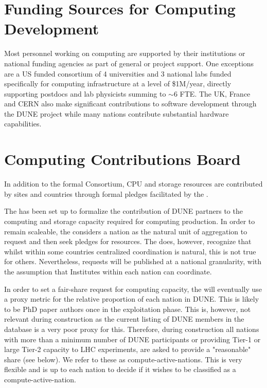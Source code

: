 \documentclass[../main-v1.tex]{subfiles}
\begin{document}
\section{Funding Sources for Computing Development}
Most personnel working on  computing are supported by their institutions or national funding agencies as part of general or  project support.  One exceptions are a US  funded consortium of 4 universities and 3 national labs funded specifically for  computing infrastructure at a level of \$1M/year, directly supporting postdocs and lab physicists summing to $\sim 6$ FTE.  The UK,  France and CERN also make significant contributions to software development through the DUNE project while many nations contribute substantial hardware capabilities. 



\section{Computing Contributions Board }\label{sec:ccb}

In addition to the formal Consortium, CPU and storage resources are contributed by sites and countries through formal pledges facilitated by the . 

The  has been set up to formalize the contribution of DUNE partners to the computing and storage capacity required for computing production. In order to remain scaleable, the  considers a nation as the natural unit of aggregation to request and then seek pledges for resources. The  does, however, recognize that whilst within some countries centralized coordination is natural, this is not true for others. Nevertheless, requests will be published at a national granularity, with the assumption that Institutes within each nation can coordinate.

In order to set a fair-share request for computing capacity, the  will eventually use a proxy metric for the relative proportion of each nation in DUNE. This is likely to be PhD paper authors once in the exploitation phase. This is, however, not relevant during construction as the current listing of DUNE members in the database is a very poor proxy for this. Therefore, during construction all nations with more than a minimum number of DUNE participants or providing Tier-1 or large Tier-2 capacity to LHC experiments, are asked to provide a "reasonable" share (see below). We refer to these as compute-active-nations.
This is very flexible and is up to each nation to decide if it wishes to be classified as a compute-active-nation.
\end{document}
